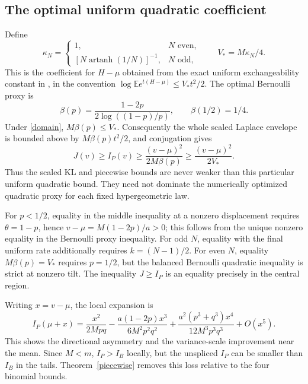 \documentclass[11pt]{article}
\newcommand{\E}{\mathbb E}
\begin{document}
\subsection{The optimal uniform quadratic coefficient}
Define
\[
 \kappa_N=\begin{cases}1,&N\text{ even},\\
 [N\operatorname{artanh}(1/N)]^{-1},&N\text{ odd},\end{cases}
 \qquad V_* = M\kappa_N/4.
\]
This is the coefficient for $H-\mu$ obtained from the exact uniform
exchangeability constant in \cite{Wang}, in the convention
$\log\E e^{t(H-\mu)}\le V_*t^2/2$.
The optimal Bernoulli proxy is
\[
 \beta(p)=\frac{1-2p}{2\log((1-p)/p)},\qquad \beta(1/2)=1/4.
\]
Under \eqref{domain}, $M\beta(p)\le V_*$. Consequently the whole scaled
Laplace envelope is bounded above by $M\beta(p)t^2/2$, and conjugation gives
\begin{equation}\label{quadratic}
 J(v)\ge I_P(v)\ge \frac{(v-\mu)^2}{2M\beta(p)}
 \ge\frac{(v-\mu)^2}{2V_*}.
\end{equation}
Thus the scaled KL and piecewise bounds are never weaker than this
particular uniform quadratic bound. They need not dominate the numerically
optimized quadratic proxy for each fixed hypergeometric law.

For $p<1/2$, equality in the middle inequality at a nonzero displacement
requires $\theta=1-p$, hence $v-\mu=M(1-2p)/a>0$; this follows from the
unique nonzero equality in the Bernoulli proxy inequality.
For odd $N$, equality with the final uniform rate additionally requires
$k=(N-1)/2$. For even $N$, equality $M\beta(p)=V_*$ requires $p=1/2$,
but the balanced Bernoulli quadratic inequality is strict at nonzero tilt.
The inequality $J\ge I_P$ is an equality precisely in the central region.

Writing $x=v-\mu$, the local expansion is
\[
 I_P(\mu+x)=\frac{x^2}{2Mpq}
 -\frac{a(1-2p)x^3}{6M^2p^2q^2}
 +\frac{a^2(p^3+q^3)x^4}{12M^3p^3q^3}+O(x^5).
\]
This shows the directional asymmetry and the variance-scale improvement
near the mean. Since $M<m$, $I_P>I_B$ locally, but the unspliced $I_P$
can be smaller than $I_B$ in the tails. Theorem~\ref{piecewise} removes
this loss relative to the four binomial bounds.
\end{document}
